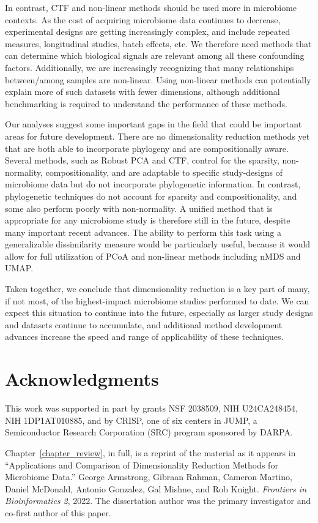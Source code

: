 In contrast, CTF and non-linear methods should be used more in microbiome contexts. As the cost of acquiring microbiome data continues to decrease, experimental designs are getting increasingly complex, and include repeated measures, longitudinal studies, batch effects, etc. We therefore need methods that can determine which biological signals are relevant among all these confounding factors. Additionally, we are increasingly recognizing that many relationships between/among samples are non-linear. Using non-linear methods can potentially explain more of such datasets with fewer dimensions, although additional benchmarking is required to understand the performance of these methods. 

Our analyses suggest some important gaps in the field that could be important areas for future development. There are no dimensionality reduction methods yet that are both able to incorporate phylogeny and are compositionally aware. Several methods, such as Robust PCA and CTF, control for the sparsity, non-normality, compositionality, and are adaptable to specific study-designs of microbiome data but do not incorporate phylogenetic information. In contrast, phylogenetic techniques do not account for sparsity and compositionality, and some also perform poorly with non-normality. A unified method that is appropriate for any microbiome study is therefore still in the future, despite many important recent advances. The ability to perform this task using a generalizable dissimilarity measure would be particularly useful, because it would allow for full utilization of PCoA and non-linear methods including nMDS and UMAP.

Taken together, we conclude that dimensionality reduction is a key part of many, if not most, of the highest-impact microbiome studies performed to date. We can expect this situation to continue into the future, especially as larger study designs and datasets continue to accumulate, and additional method development advances increase the speed and range of applicability of these techniques.






\section{Acknowledgments}

This work was supported in part by grants NSF 2038509, NIH U24CA248454, NIH 1DP1AT010885, and by CRISP, one of six centers in JUMP, a Semiconductor Research Corporation (SRC) program sponsored by DARPA.

Chapter~\ref{chapter_review}, in full, is a reprint of the material as it appears in ``Applications and Comparison of Dimensionality Reduction Methods for Microbiome Data.'' George Armstrong, Gibraan Rahman, Cameron Martino, Daniel McDonald, Antonio Gonzalez, Gal Mishne, and Rob Knight. \textit{Frontiers in Bioinformatics 2}, 2022. The dissertation author was the primary investigator and co-first author of this paper.





